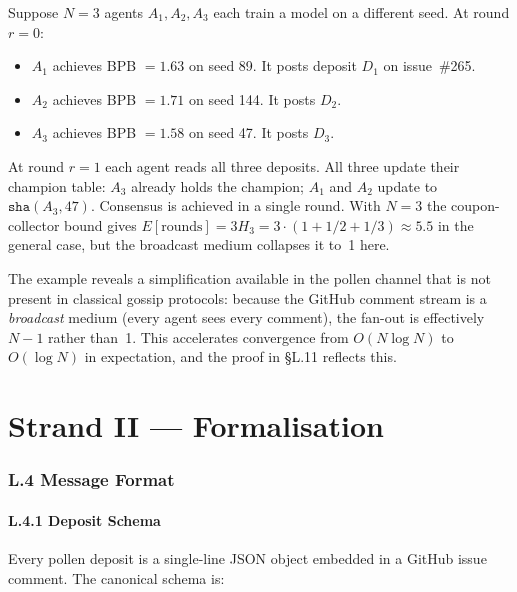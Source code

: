 \begin{example}\label{ex:three-agent}
Suppose $N = 3$ agents $A_1, A_2, A_3$ each train a model on a
different seed.  At round $r=0$:
\begin{itemize}
\item $A_1$ achieves BPB $= 1.63$ on seed 89.  It posts deposit
  $D_1$ on issue~\#265.
\item $A_2$ achieves BPB $= 1.71$ on seed 144.  It posts $D_2$.
\item $A_3$ achieves BPB $= 1.58$ on seed 47.  It posts $D_3$.
\end{itemize}
At round $r=1$ each agent reads all three deposits.  All three
update their champion table: $A_3$ already holds the champion;
$A_1$ and $A_2$ update to $\texttt{sha}(A_3, 47)$.  Consensus is
achieved in a single round.  With $N=3$ the coupon-collector bound
gives $E[\text{rounds}] = 3 H_3 = 3 \cdot (1 + 1/2 + 1/3) \approx 5.5$
in the general case, but the broadcast medium collapses it to~1 here.
\end{example}

The example reveals a simplification available in the pollen channel
that is not present in classical gossip protocols: because the GitHub
comment stream is a \emph{broadcast} medium (every agent sees every
comment), the fan-out is effectively $N-1$ rather than~1.  This
accelerates convergence from $O(N \log N)$ to $O(\log N)$ in
expectation, and the proof in §L.11 reflects this.

\part*{Strand II — Formalisation}

\section*{L.4 \quad Message Format}
\label{sec:appl-format}

\subsection*{L.4.1 \quad Deposit Schema}

Every pollen deposit is a single-line JSON object embedded in a GitHub
issue comment.  The canonical schema is:

